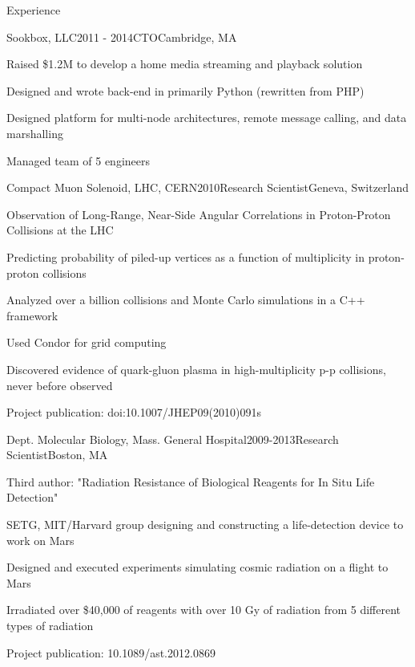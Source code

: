 \documentclass{resume}
\begin{document}

\begin{rSection}{Experience}

\begin{rSubsection}{Sookbox, LLC}{2011 - 2014}{CTO}{Cambridge, MA}
\item Raised \$1.2M to develop a home media streaming and playback solution
\item Designed and wrote back-end in primarily Python (rewritten from PHP)
\item Designed platform for multi-node architectures, remote message calling, and data marshalling
\item Managed team of 5 engineers
\end{rSubsection}

\begin{rSubsection}{Compact Muon Solenoid, LHC, CERN}{2010}{Research Scientist}{Geneva, Switzerland}
\item Observation of Long-Range, Near-Side Angular Correlations in Proton-Proton Collisions at the LHC
\item Predicting probability of piled-up vertices as a function of multiplicity in proton-proton collisions
\item Analyzed over a billion collisions and Monte Carlo simulations in a C++ framework
\item Used Condor for grid computing
\item Discovered evidence of quark-gluon plasma in high-multiplicity p-p collisions, never before observed
\item Project publication: doi:10.1007/JHEP09(2010)091s
\end{rSubsection}


\begin{rSubsection}{Dept. Molecular Biology, Mass. General Hospital}{2009-2013}{Research Scientist}{Boston, MA}
\item Third author: "Radiation Resistance of Biological Reagents for In Situ Life Detection"
\item SETG, MIT/Harvard group designing and constructing a life-detection device to work on Mars
\item Designed and executed experiments simulating cosmic radiation on a flight to Mars
\item Irradiated over \$40,000 of reagents with over 10 Gy of radiation from 5 different types of radiation
\item Project publication: 10.1089/ast.2012.0869
\end{rSubsection}



\end{rSection}
\end{document}
